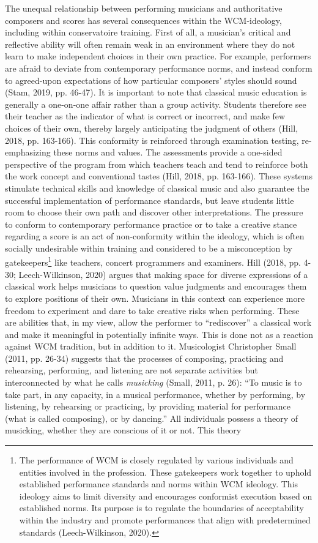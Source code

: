 \documentclass[authordate, empirical, issue]{jote-new-article}
\begin{document}
The unequal relationship between performing musicians and authoritative composers and scores has several consequences within the WCM-ideology, including within conservatoire training. First of all, a musician's critical and reflective ability will often remain weak in an environment where they do not learn to make independent choices in their own practice. For example, performers are afraid to deviate from contemporary performance norms, and instead conform to agreed-upon expectations of how particular composers' styles should sound (Stam, 2019, pp. 46-47). It is important to note that classical music education is generally a one-on-one affair rather than a group activity. Students therefore see their teacher as the indicator of what is correct or incorrect, and make few choices of their own, thereby largely anticipating the judgment of others (Hill, 2018, pp. 163-166). This conformity is reinforced through examination testing, re-emphasizing these norms and values. The assessments provide a one-sided perspective of the program from which teachers teach and tend to reinforce both the work concept and conventional tastes (Hill, 2018, pp. 163-166). These systems stimulate technical skills and knowledge of classical music and also guarantee the successful implementation of performance standards, but leave students little room to choose their own path and discover other interpretations. The pressure to conform to contemporary performance practice or to take a creative stance regarding a score is an act of non-conformity within the ideology, which is often socially undesirable within training and considered to be a misconception by gatekeepers\footnote{The performance of WCM is closely regulated by various individuals and entities involved in the profession. These gatekeepers work together to uphold established performance standards and norms within WCM ideology. This ideology aims to limit diversity and encourages conformist execution based on established norms. Its purpose is to regulate the boundaries of acceptability within the industry and promote performances that align with predetermined standards (Leech-Wilkinson, 2020). } like teachers, concert programmers and examiners. Hill (2018, pp. 4-30; Leech-Wilkinson, 2020) argues that making space for diverse expressions of a classical work helps musicians to question value judgments and encourages them to explore positions of their own. Musicians in this context can experience more freedom to experiment and dare to take creative risks when performing. These are abilities that, in my view, allow the performer to “rediscover” a classical work and make it meaningful in potentially infinite ways. This is done not as a reaction against WCM tradition, but in addition to it. Musicologist Christopher Small (2011, pp. 26-34) suggests that the processes of composing, practicing and rehearsing, performing, and listening are not separate activities but interconnected by what he calls \emph{musicking} (Small, 2011, p. 26): “To music is to take part, in any capacity, in a musical performance, whether by performing, by listening, by rehearsing or practicing, by providing material for performance (what is called composing), or by dancing.” All individuals possess a theory of musicking, whether they are conscious of it or not. This theory 
\end{document}
